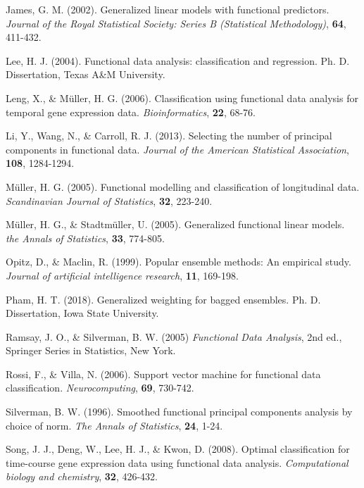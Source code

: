 \documentclass{beamer}
\begin{document}
\begin{frame}[allowframebreaks]
\begin{thebibliography}{9}
		James, G. M. (2002). Generalized linear models with functional predictors. {\em Journal of the Royal Statistical Society: Series B (Statistical Methodology)}, {\bf 64}, 411-432.
		
		Lee, H. J. (2004). Functional data analysis: classification and regression. Ph. D. Dissertation, Texas A\&M University.
		
		Leng, X., \& Müller, H. G. (2006). Classification using functional data analysis for temporal gene expression data. {\em Bioinformatics}, {\bf 22}, 68-76.
		
		Li, Y., Wang, N., \& Carroll, R. J. (2013). Selecting the number of principal components in functional data. {\em Journal of the American Statistical Association}, {\bf 108}, 1284-1294.
		
		Müller, H. G. (2005). Functional modelling and classification of longitudinal data. {\em Scandinavian Journal of Statistics}, {\bf 32}, 223-240.
		
		Müller, H. G., \& Stadtmüller, U. (2005). Generalized functional linear models. {\em the Annals of Statistics}, {\bf 33}, 774-805.
		
		Opitz, D., \& Maclin, R. (1999). Popular ensemble methods: An empirical study. {\em Journal of artificial intelligence research}, {\bf 11}, 169-198.
		
		Pham, H. T. (2018). Generalized weighting for bagged ensembles. Ph. D. Dissertation, Iowa State University.
		
		Ramsay, J. O., \& Silverman, B. W. (2005) {\em Functional Data Analysis}, 2nd ed., Springer Series in Statistics, New York.
		
		Rossi, F., \& Villa, N. (2006). Support vector machine for functional data classification. {\em Neurocomputing}, {\bf 69}, 730-742.
		
		Silverman, B. W. (1996). Smoothed functional principal components analysis by choice of norm. {\em The Annals of Statistics}, {\bf 24}, 1-24.
		
		Song, J. J., Deng, W., Lee, H. J., \& Kwon, D. (2008). Optimal classification for time-course gene expression data using functional data analysis. {\em Computational biology and chemistry}, {\bf 32}, 426-432.
		

\end{thebibliography}
\end{frame}
\end{document}
